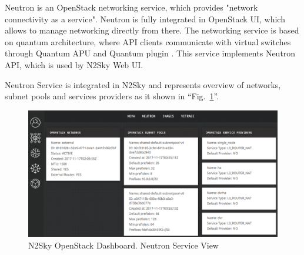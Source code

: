 Neutron is an OpenStack networking service, which provides "network connectivity as a service". Neutron is fully integrated in OpenStack UI, which allows to manage networking directly from there. The networking service is based on quantum architecture, where API clients communicate with virtual switches through Quantum APU and Quantum plugin \cite{neutron}. This service implements Neutron API, which is used by N2Sky Web UI. 

Neutron Service is integrated in N2Sky and represents overview of networks, subnet pools and services providers as it shown in ``Fig.~\ref{fig:openstack_neutron}''.

\begin{figure}[htbp]
\begin{center}
  \includegraphics[width=\linewidth]{components/4/pics/openstack_neutron.png}
  \caption{N2Sky OpenStack Dashboard. Neutron Service View}
  \label{fig:openstack_neutron}
\end{center}
\end{figure}


